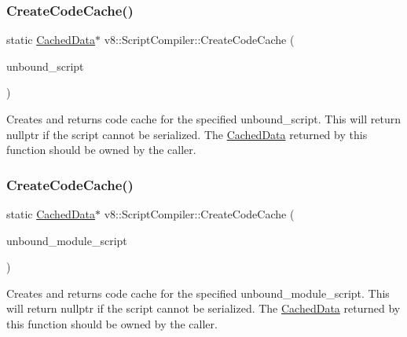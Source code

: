 \subsubsection{\texorpdfstring{Create\+Code\+Cache()}{CreateCodeCache()}\hspace{0.1cm}{\footnotesize\ttfamily [1/2]}}
{\footnotesize\ttfamily static \mbox{\hyperlink{structv8_1_1ScriptCompiler_1_1CachedData}{Cached\+Data}}$\ast$ v8\+::\+Script\+Compiler\+::\+Create\+Code\+Cache (\begin{DoxyParamCaption}\item[{\mbox{\hyperlink{classv8_1_1Local}{Local}}$<$ \mbox{\hyperlink{classv8_1_1UnboundScript}{Unbound\+Script}} $>$}]{unbound\+\_\+script }\end{DoxyParamCaption})\hspace{0.3cm}{\ttfamily [static]}}

Creates and returns code cache for the specified unbound\+\_\+script. This will return nullptr if the script cannot be serialized. The \mbox{\hyperlink{structv8_1_1ScriptCompiler_1_1CachedData}{Cached\+Data}} returned by this function should be owned by the caller. \mbox{\label{classv8_1_1ScriptCompiler_af62a9c3e10c17aec5a99f48bff05f23e}} 
\subsubsection{\texorpdfstring{Create\+Code\+Cache()}{CreateCodeCache()}\hspace{0.1cm}{\footnotesize\ttfamily [2/2]}}
{\footnotesize\ttfamily static \mbox{\hyperlink{structv8_1_1ScriptCompiler_1_1CachedData}{Cached\+Data}}$\ast$ v8\+::\+Script\+Compiler\+::\+Create\+Code\+Cache (\begin{DoxyParamCaption}\item[{\mbox{\hyperlink{classv8_1_1Local}{Local}}$<$ \mbox{\hyperlink{classv8_1_1UnboundModuleScript}{Unbound\+Module\+Script}} $>$}]{unbound\+\_\+module\+\_\+script }\end{DoxyParamCaption})\hspace{0.3cm}{\ttfamily [static]}}

Creates and returns code cache for the specified unbound\+\_\+module\+\_\+script. This will return nullptr if the script cannot be serialized. The \mbox{\hyperlink{structv8_1_1ScriptCompiler_1_1CachedData}{Cached\+Data}} returned by this function should be owned by the caller. \mbox{\label{classv8_1_1ScriptCompiler_a558a38d3be1394c153dc45e1eb059aa7}} 
